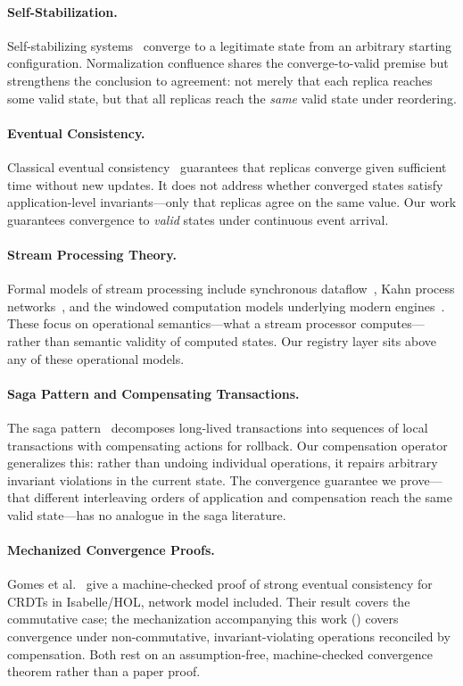 \documentclass[11pt,a4paper]{article}
\theoremstyle{plain}
\theoremstyle{definition}
\theoremstyle{remark}
\begin{document}
\paragraph{Self-Stabilization.}
Self-stabilizing systems~\cite{dijkstra1974} converge to a legitimate state from
an arbitrary starting configuration.  Normalization confluence shares the
converge-to-valid premise but strengthens the conclusion to agreement: not
merely that each replica reaches some valid state, but that all replicas reach
the \emph{same} valid state under reordering.

\paragraph{Eventual Consistency.}
Classical eventual consistency~\cite{vogels2009eventually} guarantees that
replicas converge given sufficient time without new updates.  It does not
address whether converged states satisfy application-level invariants---only
that replicas agree on the same value.  Our work guarantees convergence to
\emph{valid} states under continuous event arrival.

\paragraph{Stream Processing Theory.}
Formal models of stream processing include synchronous
dataflow~\cite{lee1987synchronous}, Kahn process
networks~\cite{kahn1974semantics}, and the windowed computation models
underlying modern engines~\cite{akidau2015dataflow}.  These focus on
operational semantics---what a stream processor computes---rather than semantic
validity of computed states.  Our registry layer sits above any of these
operational models.

\paragraph{Saga Pattern and Compensating Transactions.}
The saga pattern~\cite{garcia1987sagas} decomposes long-lived transactions into
sequences of local transactions with compensating actions for rollback.  Our
compensation operator generalizes this: rather than undoing individual
operations, it repairs arbitrary invariant violations in the current state.
The convergence guarantee we prove---that different interleaving orders of
application and compensation reach the same valid state---has no analogue in
the saga literature.

\paragraph{Mechanized Convergence Proofs.}
Gomes et al.~\cite{gomes2017verifying} give a machine-checked proof of strong
eventual consistency for CRDTs in Isabelle/HOL, network model included.  Their
result covers the commutative case; the mechanization accompanying this work
() covers convergence under non-commutative,
invariant-violating operations reconciled by compensation.  Both rest on an
assumption-free, machine-checked convergence theorem rather than a paper proof.
\end{document}
